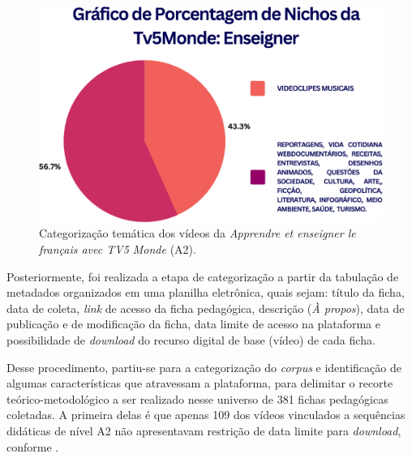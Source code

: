 \documentclass[portuguese]{textolivre}
\begin{document}
\begin{figure}
    \centering
    \begin{minipage}{.75\textwidth}
    \includegraphics[width=\linewidth]{Fig3.png}
    \caption{Categorização temática dos vídeos da \textit{Apprendre et enseigner le français avec TV5 Monde} (A2).}
    \label{fig3}
    \end{minipage}
\end{figure}

Posteriormente, foi realizada a etapa de categorização a partir da tabulação de metadados organizados em uma planilha eletrônica, quais sejam: título da ficha, data de coleta, \textit{link} de acesso da ficha pedagógica, descrição (\textit{À propos}), data de publicação e de modificação da ficha, data limite de acesso na plataforma e possibilidade de \textit{download} do recurso digital de base (vídeo) de cada ficha. 

Desse procedimento, partiu-se para a categorização do \textit{corpus} e identificação de algumas características que atravessam a plataforma, para delimitar o recorte teórico-metodológico a ser realizado nesse universo de 381 fichas pedagógicas coletadas. A primeira delas é que apenas 109 dos vídeos vinculados a sequências didáticas de nível A2 não apresentavam restrição de data limite para \textit{download}, conforme .
\end{document}
